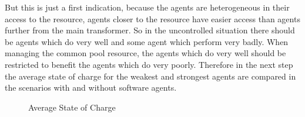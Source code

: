 \documentclass[a4paper]{article}
\begin{document}
But this is just a first indication,
because the agents are heterogeneous in their access to the resource, agents closer to the resource have easier access than agents
further from the main transformer. So in the uncontrolled situation there should be agents which do very well and some agent which  
perform very badly. When managing the common pool resource, the agents which do very well should be restricted to benefit the agents 
which do very poorly. Therefore in the next step the average state of charge for the weakest and strongest agents are compared in the 
scenarios with and without software agents.\\
\newpage
\begin{figure}[!ht]
\caption{Average State of Charge}
\label{averages_unconstrained_a}
\end{figure}
\end{document}
